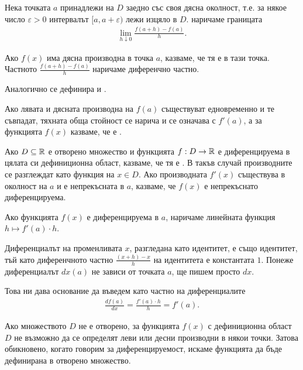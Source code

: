 \documentclass[numbers=endperiod, bibliography=totocnumbered]{scrartcl}
\begin{document}
\begin{definition}
  Нека точката \( a \) принадлежи на \( D \) заедно със своя дясна околност, т.е. за някое число \( \varepsilon > 0 \) интервалът \( [a, a + \varepsilon) \) лежи изцяло в \( D \).  наричаме границата
  \begin{align*}
    \lim_{h \downarrow 0} \frac {f(a + h) - f(a)} h.
  \end{align*}

  Ако \( f(x) \) има дясна производна в точка \( a \), казваме, че тя е  в тази точка.
  Частното \( \frac {f(a + h) - f(a)} h \) наричаме диференчно частно.

  Аналогично се дефинира  и .

  Ако лявата и дясната производна на \( f(a) \) съществуват едновременно и те съвпадат, тяхната обща стойност се нарича  и се означава с \( f'(a) \), а за функцията \( f(x) \) казваме, че е .

  Ако \( D \subseteq \mathbb{R} \) е отворено множество и функцията \( f: D \to \mathbb{R} \) е диференцируема в цялата си дефиниционна област, казваме, че тя е . В такъв случай производните се разглеждат като функция на \( x \in D \). Ако производната \( f'(x) \) съществува в околност на \( a \) и е непрекъсната в \( a \), казваме, че \( f(x) \) е непрекъснато диференцируема.

  Ако функцията \( f(x) \) е диференцируема в \( a \),  наричаме линейната функция \( h \mapsto f'(a) \cdot h \).

  Диференциалът на променливата \( x \), разгледана като идентитет, е също идентитет, тъй като диференчното частно \( \frac {(x + h) - x} h \) на идентитета е константата \( 1 \). Понеже диференциалът \( dx(a) \) не зависи от точката \( a \), ще пишем просто \( dx \).

  Това ни дава основание да въведем  като частно на диференциалите
  \begin{align*}
    \frac {df(a)} {dx} = \frac {f'(a) \cdot h} h = f'(a).
  \end{align*}
\end{definition}

\begin{note}
  Ако множеството \( D \) не е отворено, за функцията \( f(x) \) с дефиниционна област \( D \) не възможно да се определят леви или десни производни в някои точки. Затова обикновено, когато говорим за диференцируемост, искаме функцията да бъде дефинирана в отворено множество.
\end{note}
\end{document}
